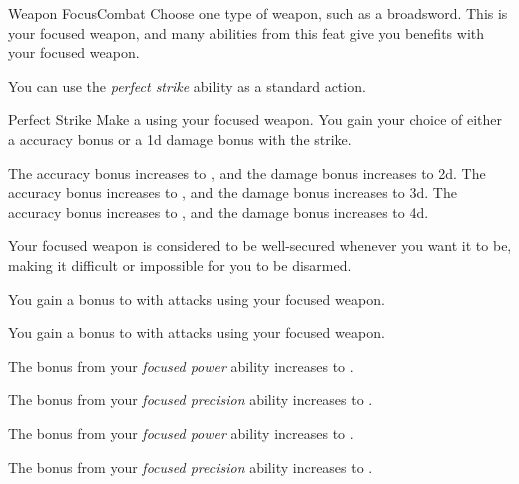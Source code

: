     \begin{feat}{Weapon Focus}{Combat}
         Choose one type of weapon, such as a broadsword.
        This is your focused weapon, and many abilities from this feat give you benefits with your focused weapon.

         You can use the \textit{perfect strike} ability as a standard action.
        \begin{freeability}{Perfect Strike}
            Make a  using your focused weapon.
            You gain your choice of either a  accuracy bonus or a \plus1d damage bonus with the strike.

            \rankline
             The accuracy bonus increases to , and the damage bonus increases to \plus2d.
             The accuracy bonus increases to , and the damage bonus increases to \plus3d.
             The accuracy bonus increases to , and the damage bonus increases to \plus4d.
        \end{freeability}

         Your focused weapon is considered to be well-secured whenever you want it to be, making it difficult or impossible for you to be disarmed.

         You gain a  bonus to  with attacks using your focused weapon.

         You gain a  bonus to  with attacks using your focused weapon.

         The bonus from your \textit{focused power} ability increases to .

         The bonus from your \textit{focused precision} ability increases to .

         The bonus from your \textit{focused power} ability increases to .

         The bonus from your \textit{focused precision} ability increases to .
    \end{feat}

